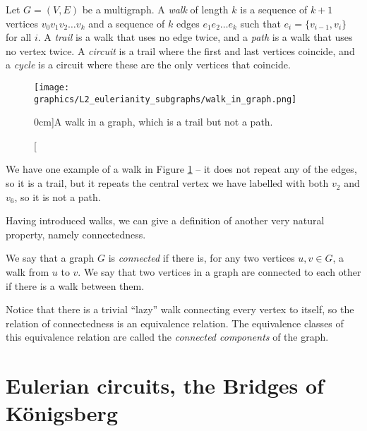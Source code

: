 \documentclass[nobib]{tufte-handout}
\begin{document}
\begin{definition}
    Let $G = (V, E)$ be a multigraph. A \emph{walk} of length $k$ is a sequence of $k+1$ vertices $v_0 v_1 v_2\ldots v_k$ and a sequence of $k$ edges $e_1e_2\ldots e_k$ such that $e_i = \{v_{i-1}, v_i\}$ for all $i$. A \emph{trail} is a walk that uses no edge twice, and a \emph{path} is a walk that uses no vertex twice. A \emph{circuit} is a trail where the first and last vertices coincide, and a \emph{cycle} is a circuit where these are the only vertices that coincide.
\end{definition}

\begin{figure}
    \centering
    \texttt{[image: graphics/L2\_eulerianity\_subgraphs/walk\_in\_graph.png]}
    \caption[][0cm]{A walk in a graph, which is a trail but not a path.}
    \label{fig:walk_in_graph}
\end{figure}

We have one example of a walk in Figure \ref{fig:walk_in_graph} -- it does not repeat any of the edges, so it is a trail, but it repeats the central vertex we have labelled with both $v_2$ and $v_6$, so it is not a path.

Having introduced walks, we can give a definition of another very natural property, namely connectedness.

\begin{definition}
  We say that a graph $G$ is \emph{connected} if there is, for any two vertices $u, v \in G$, a walk from $u$ to $v$. We say that two vertices in a graph are connected to each other if there is a walk between them.

  Notice that there is a trivial ``lazy'' walk connecting every vertex to itself, so the relation of connectedness is an equivalence relation. The equivalence classes of this equivalence relation are called the \emph{connected components} of the graph.
\end{definition}

\section{Eulerian circuits, the Bridges of Königsberg}
\end{document}
